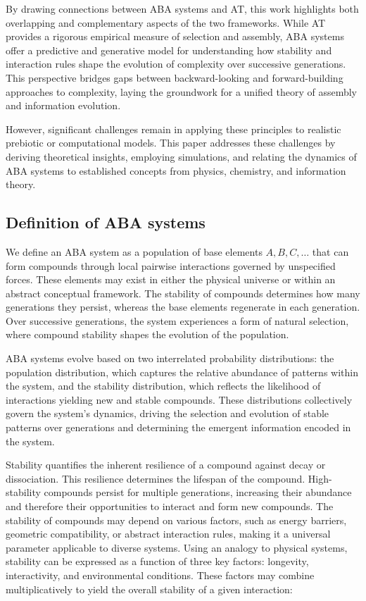 \documentclass[entropy,article,submit,pdftex,oneauthor]{Definitions/mdpi}
\begin{document}
By drawing connections between ABA systems and AT, this work highlights both overlapping and complementary aspects of the two frameworks. While AT provides a rigorous empirical measure of selection and assembly, ABA systems offer a predictive and generative model for understanding how stability and interaction rules shape the evolution of complexity over successive generations. This perspective bridges gaps between backward-looking and forward-building approaches to complexity, laying the groundwork for a unified theory of assembly and information evolution.

However, significant challenges remain in applying these principles to realistic prebiotic or computational models. This paper addresses these challenges by deriving theoretical insights, employing simulations, and relating the dynamics of ABA systems to established concepts from physics, chemistry, and information theory.


\subsection{Definition of ABA systems}

We define an ABA system as a population of base elements \( A, B, C, \dots \) that can form compounds through local pairwise interactions governed by unspecified forces. These elements may exist in either the physical universe or within an abstract conceptual framework. The stability of compounds determines how many generations they persist, whereas the base elements regenerate in each generation. Over successive generations, the system experiences a form of natural selection, where compound stability shapes the evolution of the population.

ABA systems evolve based on two interrelated probability distributions: the population distribution, which captures the relative abundance of patterns within the system, and the stability distribution, which reflects the likelihood of interactions yielding new and stable compounds. These distributions collectively govern the system's dynamics, driving the selection and evolution of stable patterns over generations and determining the emergent information encoded in the system.

Stability quantifies the inherent resilience of a compound against decay or dissociation. This resilience determines the lifespan of the compound. High-stability compounds persist for multiple generations, increasing their abundance and therefore their opportunities to interact and form new compounds. The stability of compounds may depend on various factors, such as energy barriers, geometric compatibility, or abstract interaction rules, making it a universal parameter applicable to diverse systems. Using an analogy to physical systems, stability can be expressed as a function of three key factors: longevity, interactivity, and environmental conditions. These factors may combine multiplicatively to yield the overall stability of a given interaction:
\end{document}
